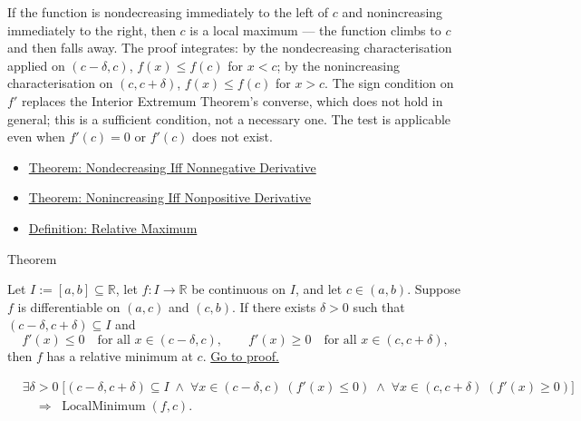 \begin{remark*}[Interpretation]
If the function is nondecreasing immediately to the left of $c$ and nonincreasing immediately to the right, then $c$ is a local maximum --- the function climbs to $c$ and then falls away. The proof integrates: by the nondecreasing characterisation applied on $(c-\delta,c)$, $f(x) \leq f(c)$ for $x < c$; by the nonincreasing characterisation on $(c,c+\delta)$, $f(x) \leq f(c)$ for $x > c$. The sign condition on $f'$ replaces the Interior Extremum Theorem's converse, which does not hold in general; this is a sufficient condition, not a necessary one. The test is applicable even when $f'(c) = 0$ or $f'(c)$ does not exist.
\end{remark*}

\begin{dependencies}
\begin{itemize}
  \item \hyperref[thm:nondecreasing-iff-nonneg-derivative]{Theorem: Nondecreasing Iff Nonnegative Derivative}
  \item \hyperref[thm:nonincreasing-iff-nonpos-derivative]{Theorem: Nonincreasing Iff Nonpositive Derivative}
  \item \hyperref[def:relative-maximum]{Definition: Relative Maximum}
\end{itemize}
\end{dependencies}


\begin{theorembox}{Theorem}
\begin{theorem}
\label{thm:first-derivative-test-minimum}
Let $I := [a,b] \subseteq \mathbb{R}$, let $f : I \to \mathbb{R}$ be continuous on $I$, and let $c \in (a,b)$. Suppose $f$ is differentiable on $(a,c)$ and $(c,b)$. If there exists $\delta > 0$ such that $(c-\delta,c+\delta) \subseteq I$ and
\[
f'(x) \leq 0 \quad \text{for all } x \in (c-\delta,c),
\qquad
f'(x) \geq 0 \quad \text{for all } x \in (c,c+\delta),
\]
then $f$ has a relative minimum at $c$.
\hyperref[prf:first-derivative-test-minimum]{Go to proof.}
\end{theorem}
\end{theorembox}

\begin{remark*}
\begin{align*}
&\exists \delta > 0\;\bigl[(c-\delta,c+\delta)\subseteq I
\;\land\;
\forall x\in(c-\delta,c)\;(f'(x)\leq 0)
\;\land\;
\forall x\in(c,c+\delta)\;(f'(x)\geq 0)\bigr]\\
&\quad\Rightarrow\; \operatorname{LocalMinimum}(f,c).
\end{align*}
\end{remark*}

